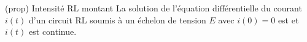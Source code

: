 \documentclass[../../main/main.tex]{subfiles}
\begin{document}
\begin{tcb*}[label=prop:isolu, sidebyside, righthand ratio=.3](prop)
	{Intensité RL montant}
	La solution de l'équation différentielle du courant $i(t)$ d'un circuit RL
	soumis à un échelon de tension $E$ avec $i(0) = 0$ est
	\psw{%
		\[
			\boxed{i(t) = \frac{E}{R}\left(1-\exp\left(-\frac{t}{\tau}\right)\right)}
		\]
	}%
	et $i(t)$ est continue.
	\vspace{-15pt}
	\tcblower
	\begin{center}
	\end{center}
\end{tcb*}
\end{document}
